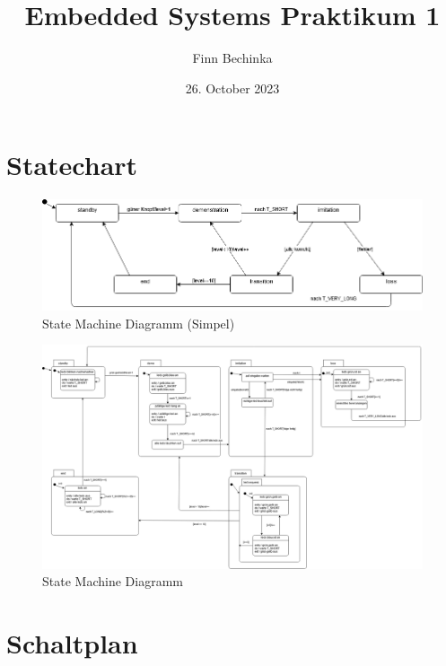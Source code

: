 \documentclass[a4paper]{article}
\title{Embedded Systems Praktikum 1}
\author{Finn Bechinka}
\date{26. October 2023}
\begin{document}
\maketitle

\section{Statechart}
\begin{figure}[H]
  \centering
  \includegraphics[width=1.0\linewidth]{media/senso-simple.png}
  \caption{State Machine Diagramm (Simpel)}
  \label{fig:statechart-simple}
\end{figure}

\begin{figure}[H]
  \centering
  \includegraphics[width=1.0\linewidth]{media/senso-statechart.png}
  \caption{State Machine Diagramm}
  \label{fig:statechat}
\end{figure}

\section{Schaltplan}
\end{document}
